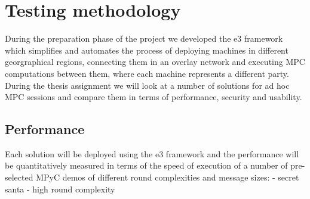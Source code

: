 \hypertarget{testing-methodology}{%
\chapter{Testing methodology}\label{testing-methodology}}

During the preparation phase of the project we developed the \gls{e3}
framework which simplifies and automates the process of deploying
machines in different georgraphical regions, connecting them in an
overlay network and executing MPC computations between them, where each
machine represents a different party. During the thesis assignment we
will look at a number of solutions for ad hoc MPC sessions and compare
them in terms of performance, security and usability.

\hypertarget{performance}{%
\section{Performance}\label{performance}}

Each solution will be deployed using the \gls{e3} framework and the
performance will be quantitatively measured in terms of the speed of
execution of a number of pre-selected MPyC demos of different round
complexities and message sizes: - secret santa - high round complexity
